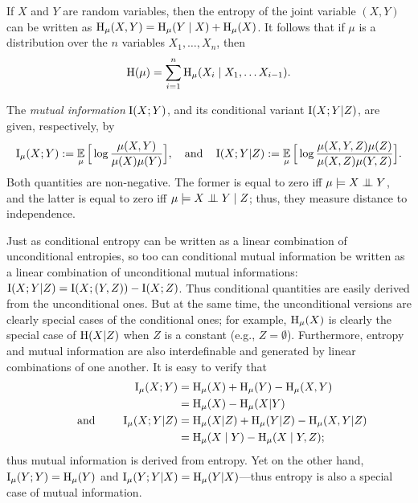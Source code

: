 \begin{fact}\label{fact:entropy-chain-rule}
    If $X$ and $Y$ are random variables, then the entropy of the joint
   variable $(X,Y)$ can be written as $\operatorname{\mathrm{H}}_\mu(X,Y) = 
\operatorname{\mathrm{H}}_\mu( Y \mid X) + \operatorname{\mathrm{H}}_\mu(X)$.
It follows that if $\mu$ is a
       distribution over the $n$ variables $X_1, \ldots, X_n$,  then
	\[ \operatorname{\mathrm{H}}(\mu) = \sum_{i = 1}^n \operatorname{\mathrm{H}}_\mu(X_i \mid X_1, \ldots X_{i-1}). \]
\end{fact}

The \emph{mutual information} $\operatorname{\mathrm{I}}(X;Y)$,
and its conditional variant $\operatorname{\mathrm{I}}(X;Y|Z)$, 
are given, respectively, by
\[
    \operatorname{\mathrm{I}}_\mu(X;Y) :=
        \operatorname*{\mathbb{E}}_{\mu} \Big[ \log \frac{\mu(X,Y)}{\mu(X) \mu(Y)}\Big],
    \quad\text{and}\quad
    \operatorname{\mathrm{I}}(X;Y|Z):= 
        \operatorname*{\mathbb{E}}_{\mu} \Big[ \log \frac{\mu(X,Y,Z)\mu(Z)}{\mu(X,Z) \mu(Y,Z)}\Big].
\]
Both quantities are non-negative.
The former is equal to zero iff $\mu \models X \mathrel{\perp\mspace{-10mu}\perp} Y$, and the latter is equal to zero iff $\mu \models X \mathrel{\perp\mspace{-10mu}\perp} Y \mid Z$;
thus, they measure distance to independence. 


Just as conditional entropy can be written as a linear combination of unconditional entropies, so too can conditional mutual information be written as a linear combination of unconditional mutual informations: $\operatorname{\mathrm{I}}(X;Y|Z) = \operatorname{\mathrm{I}}(X;(Y,Z)) - \operatorname{\mathrm{I}}(X;Z)$.  
Thus conditional quantities are easily derived from the unconditional ones. But at the same time, the unconditional versions are clearly special cases of the conditional ones; for example, $\operatorname{\mathrm{H}}_\mu(X)$ is clearly the special case of $\operatorname{\mathrm{H}}(X|Z)$ when $Z$ is a constant (e.g., $Z = \emptyset$). 
Furthermore, entropy and mutual information are also interdefinable and generated by linear combinations of one another. 
It is easy to verify that 
\begin{align*}
    \operatorname{\mathrm{I}}_\mu(X;Y) 
    &= \operatorname{\mathrm{H}}_\mu(X) + \operatorname{\mathrm{H}}_\mu(Y) - \operatorname{\mathrm{H}}_\mu(X,Y)
    \\&=  \operatorname{\mathrm{H}}_\mu(X)  - \operatorname{\mathrm{H}}_\mu(X|Y)
\\ \qquad\text{ and }\qquad
    \operatorname{\mathrm{I}}_\mu(X;Y|Z)
    &= \operatorname{\mathrm{H}}_\mu(X|Z) + \operatorname{\mathrm{H}}_\mu(Y|Z) - \operatorname{\mathrm{H}}_\mu(X,Y|Z)
    \\&= \operatorname{\mathrm{H}}_\mu(X \mid Y) - \operatorname{\mathrm{H}}_\mu(X \mid Y, Z);
\end{align*}
thus mutual information is derived from entropy. 
Yet on the other hand, $\operatorname{\mathrm{I}}_\mu(Y;Y) = \operatorname{\mathrm{H}}_\mu(Y)$ and $\operatorname{\mathrm{I}}_\mu(Y;Y|X) = \operatorname{\mathrm{H}}_\mu(Y|X)$---thus entropy is also a special case of mutual information. 

